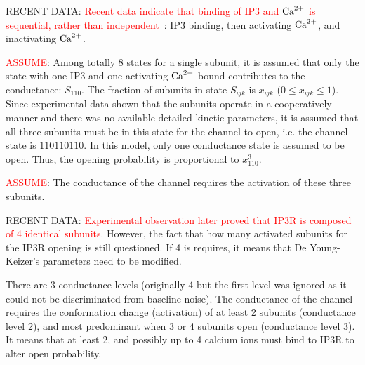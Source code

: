 \begin{mdframed}
RECENT DATA:   \textcolor{red}{Recent data
    indicate that binding of IP3 and ${\text{Ca}^{2+}}$ is sequential, rather than
    independent}~\cite{taylor1998ip3}: IP3 binding, then activating ${\text{Ca}^{2+}}$, and
    inactivating  ${\text{Ca}^{2+}}$.
\end{mdframed}

\textcolor{red}{ASSUME}: Among totally 8 states for a single subunit, it is
assumed that only the state with one IP3 and one activating ${\text{Ca}^{2+}}$ bound
  contributes to the conductance: $S_{110}$. The fraction of subunits in state
  $S_{ijk}$ is $x_{ijk}$ ($0\le x_{ijk} \le 1$). Since experimental data shown
  that the subunits operate in a cooperatively manner and there was no available
  detailed kinetic parameters, it is assumed that all three subunits must be in
  this state for the channel to open, i.e. the channel state is ${110110110}$.
  In this model, only one conductance state is assumed to be open. Thus, the
  opening probability is proportional to $x^3_{110}$.

\textcolor{red}{ASSUME}: The conductance of the channel requires the activation
of these three subunits.

\begin{mdframed}
RECENT DATA:  \textcolor{red}{Experimental observation later proved that IP3R is
    composed of 4 identical subunits}. However, the fact that how many activated
    subunits for the IP3R opening is still questioned. If 4 is requires, it
    means that De Young-Keizer's parameters need to be modified.
    
There are 3 conductance levels (originally 4 but the first level was ignored as
it could not be discriminated from baseline noise). The conductance of the
channel requires the conformation change (activation) of at least 2 subunits
(conductance level 2), and most predominant when 3 or 4 subunits open
(conductance level 3). It means that at least 2, and possibly up to 4 calcium
ions must bind to IP3R to alter open probability.
    
\end{mdframed}  

